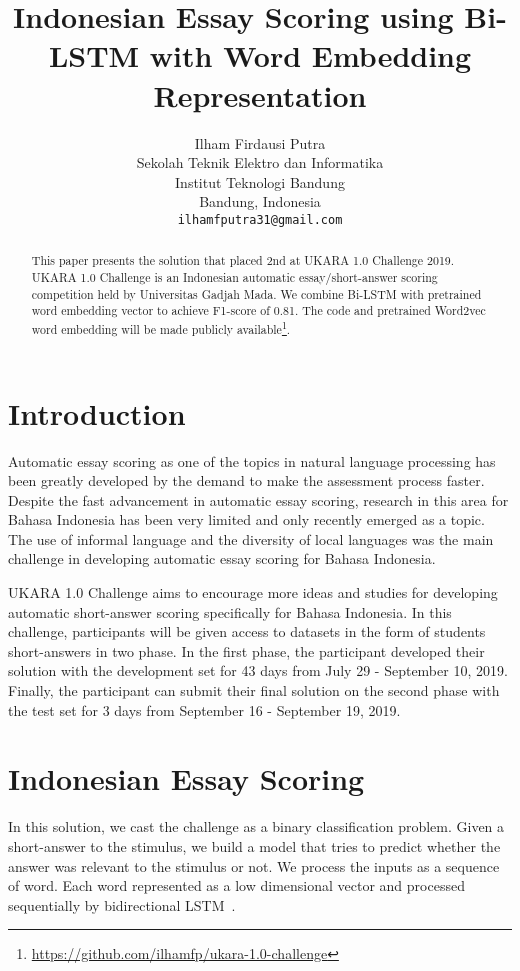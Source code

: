\documentclass[11pt,a4paper]{article}
\title{Indonesian Essay Scoring using Bi-LSTM with Word Embedding Representation}
\author{Ilham Firdausi Putra \\
  Sekolah Teknik Elektro dan Informatika \\
  Institut Teknologi Bandung \\
  Bandung, Indonesia \\
  \texttt{ilhamfputra31@gmail.com} \\}
\date{}
\begin{document}
\maketitle
\begin{abstract}
  This paper presents the solution that placed 2nd at UKARA 1.0 Challenge 2019. UKARA 1.0 Challenge is an Indonesian automatic essay/short-answer scoring competition held by Universitas Gadjah Mada. We combine Bi-LSTM with pretrained word embedding vector to achieve F1-score of 0.81. The code and pretrained Word2vec word embedding will be made publicly available\footnote{\url{https://github.com/ilhamfp/ukara-1.0-challenge}}.
\end{abstract}

\section{Introduction}

Automatic essay scoring as one of the topics in natural language processing has been greatly developed by the demand to make the assessment process faster. Despite the fast advancement in automatic essay scoring, research in this area for Bahasa Indonesia has been very limited and only recently emerged as a topic. The use of informal language and the diversity of local languages was the main challenge in developing automatic essay scoring for Bahasa Indonesia.

UKARA 1.0 Challenge aims to encourage more ideas and studies for developing automatic short-answer scoring specifically for Bahasa Indonesia. In this challenge, participants will be given access to datasets in the form of students short-answers in two phase. In the first phase, the participant developed their solution with the development set for 43 days from July 29 - September 10, 2019. Finally, the participant can submit their final solution on the second phase with the test set for 3 days from September 16 - September 19, 2019.

\section{Indonesian Essay Scoring}

In this solution, we cast the challenge as a binary classification problem. Given a short-answer to the stimulus, we build a model that tries to predict whether the answer was relevant to the stimulus or not. We process the inputs as a sequence of word. Each word represented as a low dimensional vector and processed sequentially by bidirectional LSTM~\cite{LSTM}.
\end{document}
